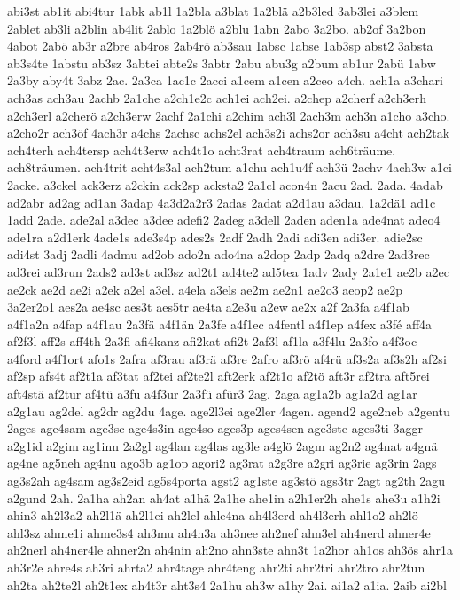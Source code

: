 {abi3st
ab1it
abi4tur
1abk
ab1l
1a2bla
a3blat
1a2blä
a2b3led
3ab3lei
a3blem
2ablet
ab3li
a2blin
ab4lit
2ablo
1a2blö
a2blu
1abn
2abo
3a2bo.
ab2of
3a2bon
4abot
2abö
ab3r
a2bre
ab4ros
2ab4rö
ab3sau
1absc
1abse
1ab3sp
abst2
3absta
ab3s4te
1abstu
ab3sz
3abtei
abte2s
3abtr
2abu
abu3g
a2bum
ab1ur
2abü
1abw
2a3by
aby4t
3abz
2ac.
2a3ca
1ac1c
2acci
a1cem
a1cen
a2ceo
a4ch.
ach1a
a3chari
ach3as
ach3au
2achb
2a1che
a2ch1e2c
ach1ei
ach2ei.
a2chep
a2cherf
a2ch3erh
a2ch3erl
a2cherö
a2ch3erw
2achf
2a1chi
a2chim
ach3l
2ach3m
ach3n
a1cho
a3cho.
a2cho2r
ach3öf
4ach3r
a4chs
2achsc
achs2el
ach3s2i
achs2or
ach3su
a4cht
ach2tak
ach4terh
ach4tersp
ach4t3erw
ach4t1o
acht3rat
ach4traum
ach6träume.
ach8träumen.
ach4trit
acht4s3al
ach2tum
a1chu
ach1u4f
ach3ü
2achv
4ach3w
a1ci
2acke.
a3ckel
ack3erz
a2ckin
ack2sp
acksta2
2a1cl
acon4n
2acu
2ad.
2ada.
4adab
ad2abr
ad2ag
ad1an
3adap
4a3d2a2r3
2adas
2adat
a2d1au
a3dau.
1a2dä1
ad1c
1add
2ade.
ade2al
a3dec
a3dee
adefi2
2adeg
a3dell
2aden
aden1a
ade4nat
adeo4
ade1ra
a2d1erk
4ade1s
ade3s4p
ades2s
2adf
2adh
2adi
adi3en
adi3er.
adie2sc
adi4st
3adj
2adli
4admu
ad2ob
ado2n
ado4na
a2dop
2adp
2adq
a2dre
2ad3rec
ad3rei
ad3run
2ads2
ad3st
ad3sz
ad2t1
ad4te2
ad5tea
1adv
2ady
2a1e1
ae2b
a2ec
ae2ck
ae2d
ae2i
a2ek
a2el
a3el.
a4ela
a3els
ae2m
ae2n1
ae2o3
aeop2
ae2p
3a2er2o1
aes2a
ae4sc
aes3t
aes5tr
ae4ta
a2e3u
a2ew
ae2x
a2f
2a3fa
a4f1ab
a4f1a2n
a4fap
a4f1au
2a3fä
a4f1än
2a3fe
a4f1ec
a4fentl
a4f1ep
a4fex
a3fé
aff4a
af2f3l
aff2s
aff4th
2a3fi
afi4kanz
afi2kat
afi2t
2af3l
af1la
a3f4lu
2a3fo
a4f3oc
a4ford
a4f1ort
afo1s
2afra
af3rau
af3rä
af3re
2afro
af3rö
af4rü
af3s2a
af3s2h
af2si
af2sp
afs4t
af2t1a
af3tat
af2tei
af2te2l
aft2erk
af2t1o
af2tö
aft3r
af2tra
aft5rei
aft4stä
af2tur
af4tü
a3fu
a4f3ur
2a3fü
afür3
2ag.
2aga
ag1a2b
ag1a2d
ag1ar
a2g1au
ag2del
ag2dr
ag2du
4age.
age2l3ei
age2ler
4agen.
agend2
age2neb
a2gentu
2ages
age4sam
age3sc
age4s3in
age4so
ages3p
ages4sen
age3ste
ages3ti
3aggr
a2g1id
a2gim
ag1inn
2a2gl
ag4lan
ag4las
ag3le
a4glö
2agm
ag2n2
ag4nat
a4gnä
ag4ne
ag5neh
ag4nu
ago3b
ag1op
agori2
ag3rat
a2g3re
a2gri
ag3rie
ag3rin
2ags
ag3s2ah
ag4sam
ag3s2eid
ag5s4porta
agst2
ag1ste
ag3stö
ags3tr
2agt
ag2th
2agu
a2gund
2ah.
2a1ha
ah2an
ah4at
a1hä
2a1he
ahe1in
a2h1er2h
ahe1s
ahe3u
a1h2i
ahin3
ah2l3a2
ah2l1ä
ah2l1ei
ah2lel
ahle4na
ah4l3erd
ah4l3erh
ahl1o2
ah2lö
ahl3sz
ahme1i
ahme3s4
ah3mu
ah4n3a
ah3nee
ah2nef
ahn3el
ah4nerd
ahner4e
ah2nerl
ah4ner4le
ahner2n
ah4nin
ah2no
ahn3ste
ahn3t
1a2hor
ah1os
ah3ös
ahr1a
ah3r2e
ahre4s
ah3ri
ahrta2
ahr4tage
ahr4teng
ahr2ti
ahr2tri
ahr2tro
ahr2tun
ah2ta
ah2te2l
ah2t1ex
ah4t3r
aht3s4
2a1hu
ah3w
a1hy
2ai.
ai1a2
a1ia.
2aib
ai2bl
}
